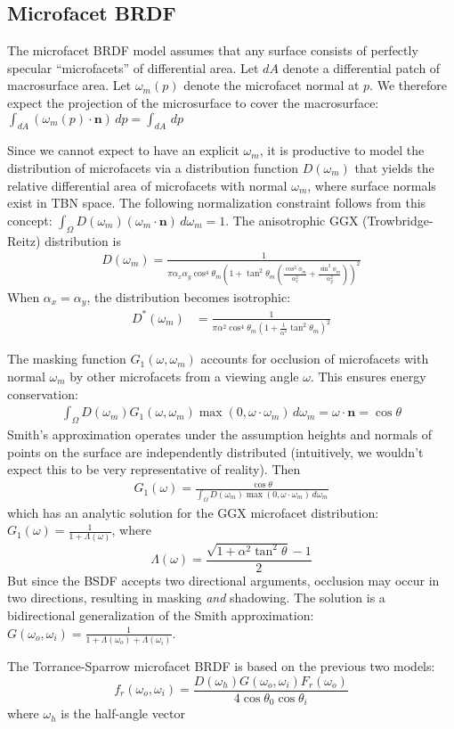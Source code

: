 \documentclass{article}
\begin{document}
  \subsection{Microfacet BRDF}
  The microfacet BRDF model 
  assumes that any surface consists of 
  perfectly specular ``microfacets'' 
  of differential area.
  Let $dA$ denote a differential patch of macrosurface area.
  Let $\omega_m(p)$ denote 
  the microfacet normal at $p$. 
  We therefore expect the projection of the 
  microsurface to cover the macrosurface:
  $\int_{dA}(\omega_m(p)\cdot \bm{n})\,dp = \int_{dA}\,dp$
  
  Since we cannot expect to 
  have an explicit $\omega_m$, 
  it is productive to model the distribution of 
  microfacets via a distribution function 
  $D(\omega_m)$ that yields 
  the relative differential area of microfacets with normal $\omega_m$,
  where surface normals exist in TBN space.
  The following normalization constraint follows from this 
  concept:
  $\int_{\Omega} D(\omega_m)(\omega_m \cdot \bm{n})\,d\omega_m = 1$.
  The anisotrophic GGX (Trowbridge-Reitz) distribution is
  \begin{align*}
    D(\omega_m) = \frac{1}{\pi\alpha_x\alpha_y\cos^4\theta_m
    \left(1+\tan^2\theta_m\left(\frac{\cos^2\phi_m}{\alpha_x^2} + \frac{\sin^2\phi_m}{\alpha_y^2}\right)\right)^2}
  \end{align*}
  When $\alpha_x = \alpha_y$, the distribution becomes isotrophic:
  \begin{align*}
    D^\ast(\omega_m) &= \frac{1}
    {\pi\alpha^2\cos^4\theta_m\left(1+\frac{1}{\alpha^2}\tan^2\theta_m\right)^2}
  \end{align*}

  The masking function $G_1(\omega, \omega_m)$
  accounts for occlusion of microfacets with normal $\omega_m$ by other microfacets 
  from a viewing angle $\omega$. This ensures 
  energy conservation:
  \begin{align*}
    \int_{\Omega} D(\omega_m)G_1(\omega, \omega_m)\max(0, \omega \cdot \omega_m)\,d\omega_m = \omega \cdot \bm{n} = \cos\theta
  \end{align*}
  Smith's approximation operates under the assumption 
  heights and normals of points on the surface are 
  independently distributed (intuitively,
  we wouldn't expect this to be very representative of reality).
  Then 
  \begin{align*}
    G_1(\omega) = \frac{\cos\theta}{\int_{\Omega} D(\omega_m)\max(0, \omega \cdot \omega_m)\,d\omega_m}
  \end{align*}
  which has an analytic solution for the GGX microfacet distribution:
  $G_1(\omega) = \frac{1}{1 + \Lambda(\omega)}$, 
  where 
  \[ \Lambda(\omega) = \frac{\sqrt{1 + \alpha^2\tan^2\theta} - 1}{2} \]
  But since the BSDF accepts two 
  directional arguments, 
  occlusion may occur in two directions,
  resulting in masking \textit{and} shadowing.
  The solution is a bidirectional generalization of 
  the Smith approximation: $G(\omega_o, \omega_i) = \frac{1}{1 + \Lambda(\omega_o) + \Lambda(\omega_i)}$.

  The Torrance-Sparrow microfacet BRDF 
  is based on the previous two models:
  \[f_r(\omega_o, \omega_i) = \frac{D(\omega_h)G(\omega_o, \omega_i)F_r(\omega_o)}{4\cos\theta_0\cos\theta_i}\]
  where $\omega_h$ is the half-angle vector
\end{document}
